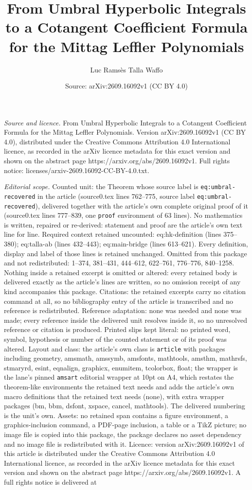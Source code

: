 \documentclass[10pt,a4paper]{amsart}
\title[From Umbral Hyperbolic Integrals to a Cotangent Coefficient ]{From Umbral Hyperbolic Integrals to a Cotangent Coefficient Formula for the Mittag Leffler Polynomials}
\author{Luc Rams\`es Talla Waffo}
\date{Source: arXiv:2609.16092v1 (CC BY 4.0)}
\begin{document}
\maketitle

\noindent\emph{Source and licence.} From Umbral Hyperbolic Integrals to a Cotangent Coefficient Formula for the Mittag Leffler Polynomials. Version arXiv:2609.16092v1 (CC BY 4.0), distributed under the Creative Commons Attribution 4.0 International licence, as recorded in the arXiv licence metadata for this exact version and shown on the abstract page https://arxiv.org/abs/2609.16092v1. Full rights notice: licenses/arxiv-2609.16092-CC-BY-4.0.txt.\par\smallskip

\noindent\textit{Editorial scope.} Counted unit: the Theorem whose source label is \texttt{eq:umbral-recovered} in the article (source0.tex lines 762--775, source label \texttt{eq:umbral-recovered}), delivered together with the article's own complete original proof of it (source0.tex lines 777--839, one \texttt{proof} environment of 63 lines). No mathematics is written, repaired or re-derived: statement and proof are the article's own text line for line. Required context retained uncounted: eq:hk-definition (lines 375--380); eq:talla-ab (lines 432--443); eq:main-bridge (lines 613--621). Every definition, display and label of those lines is retained unchanged. Omitted from this package and not redistributed: 1--374, 381--431, 444--612, 622--761, 776--776, 840--1258. Nothing inside a retained excerpt is omitted or altered: every retained body is delivered exactly as the article's lines are written, so no omission receipt of any kind accompanies this package. Citations: the retained excerpts carry no citation command at all, so no bibliography entry of the article is transcribed and no reference is redistributed. Reference adaptation: none was needed and none was made; every reference inside the delivered unit resolves inside it, so no unresolved reference or citation is produced. Printed slips kept literal: no printed word, symbol, hypothesis or number of the counted statement or of its proof was altered. Layout and class: the article's own class is \texttt{article} with packages including geometry, amsmath, amssymb, amsfonts, mathtools, amsthm, mathrsfs, stmaryrd, esint, eqnalign, graphicx, enumitem, tcolorbox, float; the wrapper is the lane's pinned \texttt{amsart} editorial wrapper at 10pt on A4, which restates the theorem-like environments the retained text needs and adds the article's own macro definitions that the retained text needs (none), with extra wrapper packages (bm, bbm, dsfont, xspace, cancel, mathtools). The delivered numbering is the unit's own. Assets: no retained span contains a figure environment, a graphics-inclusion command, a PDF-page inclusion, a table or a TikZ picture; no image file is copied into this package, the package declares no asset dependency and no image file is redistributed with it. Licence: version arXiv:2609.16092v1 of this article is distributed under the Creative Commons Attribution 4.0 International licence, as recorded in the arXiv licence metadata for this exact version and shown on the abstract page https://arxiv.org/abs/2609.16092v1. A full rights notice is delivered at 
\end{document}
